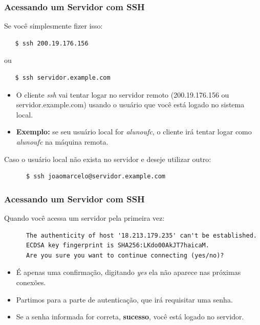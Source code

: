 \documentclass{beamer}
\begin{document}
\begin{frame}[fragile]
   \frametitle{Acessando um Servidor com SSH}
   Se você simplesmente fizer isso:
   \begin{verbatim}
   $ ssh 200.19.176.156
   \end{verbatim}
   ou
   \begin{verbatim}
   $ ssh servidor.example.com
   \end{verbatim}
   \begin{itemize}
      \item O cliente \textit{ssh} vai tentar logar no servidor remoto (200.19.176.156 ou servidor.example.com) usando o usuário que você está logado no sistema local.
      \item \textbf{Exemplo:} se seu usuário local for \textit{alunoufc}, o cliente irá tentar logar como \textit{alunoufc} na máquina remota.
   \end{itemize}

   Caso o usuário local não exista no servidor e deseje utilizar outro:
   \begin{verbatim}
      $ ssh joaomarcelo@servidor.example.com
   \end{verbatim}
\end{frame}

\begin{frame}[fragile]
   \frametitle{Acessando um Servidor com SSH}
   Quando você acessa um servidor pela primeira vez:
   \begin{verbatim}
      The authenticity of host '18.213.179.235' can't be established.
      ECDSA key fingerprint is SHA256:LKdo00AkJT7haicaM.
      Are you sure you want to continue connecting (yes/no)?
   \end{verbatim}
   \begin{itemize}
      \item É apenas uma confirmação, digitando \textit{yes} ela não aparece nas próximas conexões.
      \item Partimos para a parte de autenticação, que irá requisitar uma senha.
      \item Se a senha informada for correta, \textbf{sucesso}, você está logado no servidor.
   \end{itemize}
\end{frame}
\end{document}
